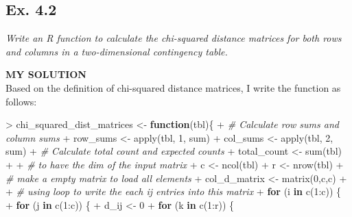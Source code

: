 \documentclass[
]{article}
\newenvironment{Shaded}{\begin{snugshade}}{\end{snugshade}}
\newcommand{\CommentTok}[1]{\textcolor[rgb]{0.56,0.35,0.01}{\textit{#1}}}
\newcommand{\ControlFlowTok}[1]{\textcolor[rgb]{0.13,0.29,0.53}{\textbf{#1}}}
\newcommand{\DecValTok}[1]{\textcolor[rgb]{0.00,0.00,0.81}{#1}}
\newcommand{\FunctionTok}[1]{\textcolor[rgb]{0.00,0.00,0.00}{#1}}
\newcommand{\NormalTok}[1]{#1}
\newcommand{\OtherTok}[1]{\textcolor[rgb]{0.56,0.35,0.01}{#1}}
\newcommand{\SpecialCharTok}[1]{\textcolor[rgb]{0.00,0.00,0.00}{#1}}
\begin{document}
\hypertarget{ex.-4.2}{%
\subsection{Ex. 4.2}\label{ex.-4.2}}

\emph{Write an R function to calculate the chi-squared distance matrices
for both rows and columns in a two-dimensional contingency table.}

\textbf{MY SOLUTION}\\
Based on the definition of chi-squared distance matrices, I write the
function as follows:

\begin{Shaded}
\begin{Highlighting}[]
\SpecialCharTok{\textgreater{}}\NormalTok{ chi\_squared\_dist\_matrices }\OtherTok{\textless{}{-}} \ControlFlowTok{function}\NormalTok{(tbl)\{}
\SpecialCharTok{+}   \CommentTok{\# Calculate row sums and column sums}
\SpecialCharTok{+}\NormalTok{   row\_sums }\OtherTok{\textless{}{-}} \FunctionTok{apply}\NormalTok{(tbl, }\DecValTok{1}\NormalTok{, sum)}
\SpecialCharTok{+}\NormalTok{   col\_sums }\OtherTok{\textless{}{-}} \FunctionTok{apply}\NormalTok{(tbl, }\DecValTok{2}\NormalTok{, sum)}
\SpecialCharTok{+}   \CommentTok{\# Calculate total count and expected counts}
\SpecialCharTok{+}\NormalTok{   total\_count }\OtherTok{\textless{}{-}} \FunctionTok{sum}\NormalTok{(tbl)}
\SpecialCharTok{+}   
\SpecialCharTok{+}   \CommentTok{\# to have the dim of the input matrix}
\SpecialCharTok{+}\NormalTok{   c }\OtherTok{\textless{}{-}} \FunctionTok{ncol}\NormalTok{(tbl)}
\SpecialCharTok{+}\NormalTok{   r }\OtherTok{\textless{}{-}} \FunctionTok{nrow}\NormalTok{(tbl)}
\SpecialCharTok{+}   \CommentTok{\# make a empty matrix to load all elements}
\SpecialCharTok{+}\NormalTok{   col\_d\_matrix }\OtherTok{\textless{}{-}} \FunctionTok{matrix}\NormalTok{(}\DecValTok{0}\NormalTok{,c,c)}
\SpecialCharTok{+}   
\SpecialCharTok{+}   \CommentTok{\# using loop to write the each ij entries into this matrix}
\SpecialCharTok{+}   \ControlFlowTok{for}\NormalTok{ (i }\ControlFlowTok{in} \FunctionTok{c}\NormalTok{(}\DecValTok{1}\SpecialCharTok{:}\NormalTok{c)) \{}
\SpecialCharTok{+}     \ControlFlowTok{for}\NormalTok{ (j }\ControlFlowTok{in} \FunctionTok{c}\NormalTok{(}\DecValTok{1}\SpecialCharTok{:}\NormalTok{c)) \{}
\SpecialCharTok{+}\NormalTok{       d\_ij }\OtherTok{\textless{}{-}} \DecValTok{0}
\SpecialCharTok{+}       \ControlFlowTok{for}\NormalTok{ (k }\ControlFlowTok{in} \FunctionTok{c}\NormalTok{(}\DecValTok{1}\SpecialCharTok{:}\NormalTok{r)) \{}

\end{Highlighting}
\end{Shaded}
\end{document}
